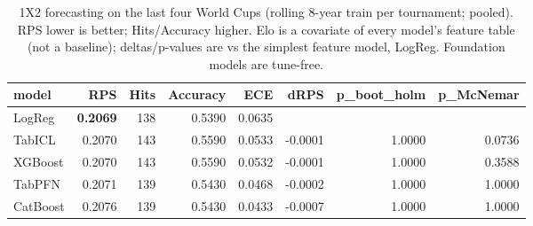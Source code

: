 \begin{table}[t]
  \centering
  \caption{1X2 forecasting on the last four World Cups (rolling 8-year train per tournament; pooled). RPS lower is better; Hits/Accuracy higher. Elo is a covariate of every model's feature table (not a baseline); deltas/p-values are vs the simplest feature model, LogReg. Foundation models are tune-free.}
  \label{tab:worldcup_eval}
  \begin{tabular}{lrrrrrrr}
  \toprule
  model & RPS & Hits & Accuracy & ECE & dRPS & p\_boot\_holm & p\_McNemar \\
  \midrule
  LogReg & \textbf{0.2069} & 138 & 0.5390 & 0.0635 &  &  &  \\
  TabICL & 0.2070 & 143 & 0.5590 & 0.0533 & -0.0001 & 1.0000 & 0.0736 \\
  XGBoost & 0.2070 & 143 & 0.5590 & 0.0532 & -0.0001 & 1.0000 & 0.3588 \\
  TabPFN & 0.2071 & 139 & 0.5430 & 0.0468 & -0.0002 & 1.0000 & 1.0000 \\
  CatBoost & 0.2076 & 139 & 0.5430 & 0.0433 & -0.0007 & 1.0000 & 1.0000 \\
  \bottomrule
  \end{tabular}
\end{table}

